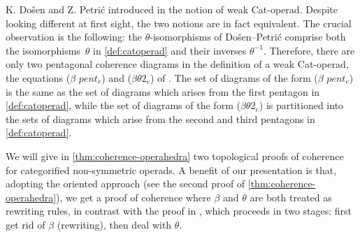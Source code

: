 \begin{rem}
\label{rem:DPLA}
K. Do{\v s}en and Z. Petri{\'c} introduced in \cite[Sec.~12]{DP15} the notion of weak Cat-operad.
Despite looking different at first sight, the two notions are in fact equivalent.
The crucial observation is the following: the $\theta$-isomorphisms of Do{\v s}en--Petri{\'c} comprise both the isomorphisms~$\theta$ in \cref{def:catoperad} and their inverses $\theta^{-1}$.
Therefore, there are only two pentagonal coherence diagrams in the definition of a weak Cat-operad, the equations ($\beta$ $pent_e$) and ($\beta\theta 2_e$) of \cite[Section 9]{DP15}.
The set of diagrams of the form ($\beta$ $pent_e$) is the same as the set of diagrams which arises from the first pentagon in \cref{def:catoperad}, while the set of diagrams of the form ($\beta\theta 2_e$) is partitioned into the sets of diagrams which arise from the second and third pentagons in \cref{def:catoperad}.

We will give in \cref{thm:coherence-operahedra} two topological proofs of coherence for categorified non-symmetric operads.
A benefit of our presentation is that, adopting the oriented approach (see the second proof of \cref{thm:coherence-operahedra}), we get a proof of coherence where $\beta$ and $\theta$ are both treated as rewriting rules, in contrast with the proof in \cite{DP15}, which proceeds in two stages: first get rid of $\beta$ (rewriting), then deal with $\theta$. 
\end{rem}


